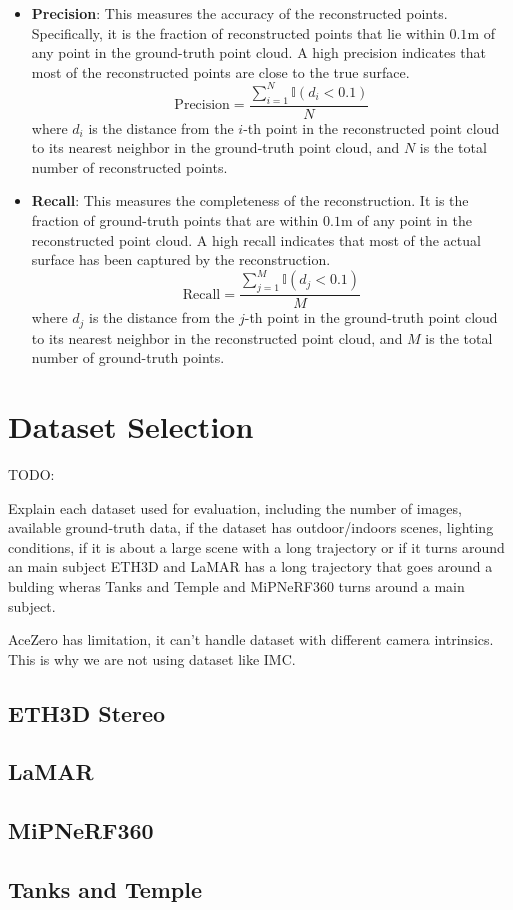 \begin{itemize}
    \item \textbf{Precision}: This measures the accuracy of the reconstructed points. Specifically, it is the fraction of reconstructed points that lie within $0.1$m of any point in the ground-truth point cloud. 
    A high precision indicates that most of the reconstructed points are close to the true surface.
    \begin{equation}
        \text{Precision} = \frac{\sum_{i=1}^{N} \mathbb{I}(d_i < 0.1)}{N}
    \end{equation}
    where $d_i$ is the distance from the $i$-th point in the reconstructed point cloud to its nearest neighbor in the ground-truth point cloud, and $N$ is the total number of reconstructed points.

    \item \textbf{Recall}: This measures the completeness of the reconstruction. It is the fraction of ground-truth points that are within $0.1$m of any point in the reconstructed point cloud.
    A high recall indicates that most of the actual surface has been captured by the reconstruction.
    \begin{equation}
        \text{Recall} = \frac{\sum_{j=1}^{M} \mathbb{I}(d_j < 0.1)}{M}
    \end{equation}
    where $d_j$ is the distance from the $j$-th point in the ground-truth point cloud to its nearest neighbor in the reconstructed point cloud, and $M$ is the total number of ground-truth points.
\end{itemize}



\section{Dataset Selection}\label{sec:dataset-selection}

TODO: 

Explain each dataset used for evaluation, including the number of images, available ground-truth data, 
if the dataset has outdoor/indoors scenes, lighting conditions, if it is about a large scene with a long trajectory or if it turns around an main subject
ETH3D and LaMAR has a long trajectory that goes around a bulding wheras Tanks and Temple and MiPNeRF360 turns around a main subject.

AceZero has limitation, it can't handle dataset with different camera intrinsics. This is why we are not using dataset like IMC.


\subsection{ETH3D Stereo}


\subsection{LaMAR}


\subsection{MiPNeRF360}


\subsection{Tanks and Temple}